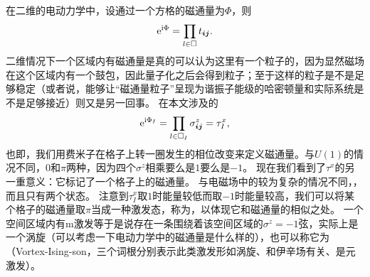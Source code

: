 在二维的电动力学中，设通过一个方格的磁通量为$\Phi$，则
\[
    \mathrm{e}^{\mathrm{i} \Phi} = \prod_{l \in \Box} t_{\vb*{i} \vb*{j}}.
\]
二维情况下一个区域内有磁通量是真的可以认为这里有一个粒子的，因为显然磁场在这个区域内有一个鼓包，因此量子化之后会得到粒子；至于这样的粒子是不是足够稳定（或者说，能够让“磁通量粒子”呈现为谐振子能级的哈密顿量和实际系统是不是足够接近）则又是另一回事。
在本文涉及的
\begin{equation}
    \mathrm{e}^{\mathrm{i} \Phi_I} = \prod_{l \in \Box_I} {\sigma}^z_{\vb*{i} \vb*{j}} = {\tau}^x_I,
\end{equation}
也即，我们用费米子在格子上转一圈发生的相位改变来定义磁通量。与$U(1)$的情况不同，$0$和$\pi$两种，因为四个$\sigma^z$相乘要么是$1$要么是$-1$。
现在我们看到了${\tau}^x$的另一重意义：它标记了一个格子上的磁通量。
与电磁场中的较为复杂的情况不同，，而且只有两个状态。
注意到$\tau_I^x$取$1$时能量较低而取$-1$时能量较高，我们可以将某个格子的磁通量取$\pi$当成一种激发态，称为，以体现它和磁通量的相似之处。
一个空间区域内有m激发等于是说存在一条围绕着该空间区域的$\sigma^z=-1$弦，实际上是一个涡旋（可以考虑一下电动力学中的磁通量是什么样的），也可以称它为（Vortex-Ising-son，三个词根分别表示此类激发形如涡旋、和伊辛场有关、是元激发）。

